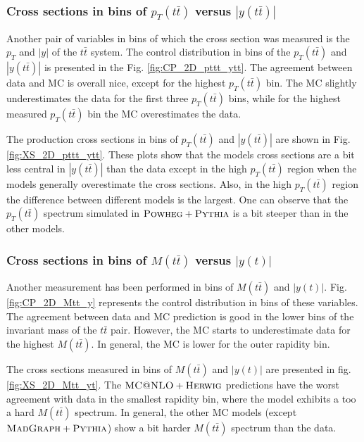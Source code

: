 
\subsubsection{Cross sections in bins of $p_{T}(t\bar{t})$ versus $|y(t\bar{t})|$}

Another pair of variables in bins of which the cross section was measured is the $p_{T}$ and $|y|$ of the $t\bar{t}$ system. 
The control distribution in bins of the $p_{T}(t\bar{t})$ and $|y(t\bar{t})|$ is presented in the Fig. \ref{fig:CP_2D_pttt_ytt}. 
The agreement between data and MC is overall nice, except for the highest $p_{T}(t\bar{t})$ bin. The MC slightly underestimates 
the data for the first three $p_{T}(t\bar{t})$ bins, while for the highest measured $p_{T}(t\bar{t})$ bin the MC overestimates the data. 

The production cross sections in bins of $p_{T}(t\bar{t})$ and $|y(t\bar{t})|$ are shown in Fig. \ref{fig:XS_2D_pttt_ytt}.
These plots show that the models cross sections are a bit less central in $|y(t\bar{t})|$ than the data except in the 
high $p_{T}(t\bar{t})$ region when the models generally overestimate the cross sections. Also, in the high $p_{T}(t\bar{t})$
region the difference between different models is the largest. One can observe that the $p_{T}(t\bar{t})$ spectrum simulated
in $\textsc{Powheg}+\textsc{Pythia}$ is a bit steeper than in the other models.


\subsubsection{Cross sections in bins of $M(t\bar{t})$ versus $|y(t)|$}

Another measurement has been performed in bins of $M(t\bar{t})$ and $|y(t)|$. Fig. \ref{fig:CP_2D_Mtt_y} represents the control distribution in bins of these variables.
The agreement between data and MC prediction is good in the lower bins of the invariant mass of the $t\bar{t}$ pair. 
However, the MC starts to underestimate data for the highest $M(t\bar{t})$. In general, the MC is lower for the outer rapidity 
bin. 

The cross sections measured in bins of $M(t\bar{t})$ and $|y(t)|$ are presented in fig. \ref{fig:XS_2D_Mtt_yt}. The $\textsc{MC@NLO}+\textsc{Herwig}$ 
predictions have the worst agreement with data in the smallest rapidity bin, where the model exhibits a too a hard $M(t\bar{t})$ spectrum.
In general, the other MC models (except $\textsc{MadGraph} + \textsc{Pythia}$) show a bit harder $M(t\bar{t})$ spectrum than the data.

